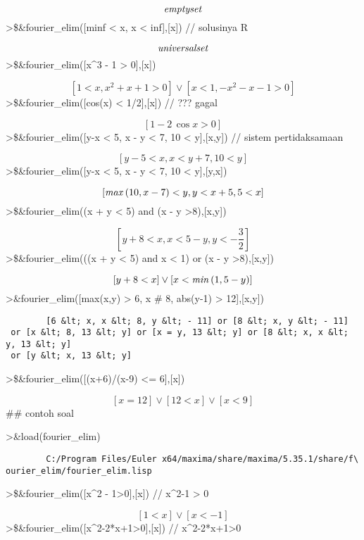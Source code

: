 \documentclass[
]{book}
\begin{document}
\[{\it emptyset}\]\textgreater\$\&fourier\_elim({[}minf \textless{} x, x \textless{} inf{]},{[}x{]}) // solusinya R

\[{\it universalset}\]\textgreater\$\&fourier\_elim({[}x\^{}3 - 1 \textgreater{} 0{]},{[}x{]})

\[\left[ 1<x , x^2+x+1>0 \right] \lor \left[ x<1 , -x^2-x-1>0
  \right] \]\textgreater\$\&fourier\_elim({[}cos(x) \textless{} 1/2{]},{[}x{]}) // ??? gagal

\[\left[ 1-2\,\cos x>0 \right] \]\textgreater\$\&fourier\_elim({[}y-x \textless{} 5, x - y \textless{} 7, 10 \textless{} y{]},{[}x,y{]}) // sistem pertidaksamaan

\[\left[ y-5<x , x<y+7 , 10<y \right] \]\textgreater\$\&fourier\_elim({[}y-x \textless{} 5, x - y \textless{} 7, 10 \textless{} y{]},{[}y,x{]})

\[\left[ {\it max}\left(10 , x-7\right)<y , y<x+5 , 5<x \right] \]\textgreater\$\&fourier\_elim((x + y \textless{} 5) and (x - y \textgreater8),{[}x,y{]})

\[\left[ y+8<x , x<5-y , y<-\frac{3}{2} \right] \]\textgreater\$\&fourier\_elim(((x + y \textless{} 5) and x \textless{} 1) or (x - y \textgreater8),{[}x,y{]})

\[\left[ y+8<x \right] \lor \left[ x<{\it min}\left(1 , 5-y\right)
  \right] \]\textgreater\&fourier\_elim({[}max(x,y) \textgreater{} 6, x \# 8, abs(y-1) \textgreater{} 12{]},{[}x,y{]})

\begin{verbatim}
        [6 &lt; x, x &lt; 8, y &lt; - 11] or [8 &lt; x, y &lt; - 11]
 or [x &lt; 8, 13 &lt; y] or [x = y, 13 &lt; y] or [8 &lt; x, x &lt; y, 13 &lt; y]
 or [y &lt; x, 13 &lt; y]
\end{verbatim}

\textgreater\$\&fourier\_elim({[}(x+6)/(x-9) \textless= 6{]},{[}x{]})

\[\left[ x=12 \right] \lor \left[ 12<x \right] \lor \left[ x<9
  \right] \]\#\# contoh soal

\textgreater\&load(fourier\_elim)

\begin{verbatim}
        C:/Program Files/Euler x64/maxima/share/maxima/5.35.1/share/f\
ourier_elim/fourier_elim.lisp
\end{verbatim}

\textgreater\$\&fourier\_elim({[}x\^{}2 - 1\textgreater0{]},{[}x{]}) // x\^{}2-1 \textgreater{} 0

\[\left[ 1<x \right] \lor \left[ x<-1 \right] \]\textgreater\$\&fourier\_elim({[}x\^{}2-2*x+1\textgreater0{]},{[}x{]}) // x\^{}2-2*x+1\textgreater0
\end{document}
